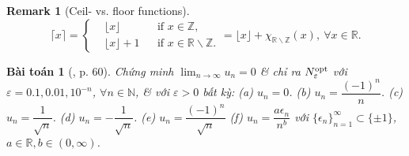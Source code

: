 \documentclass[oneside]{book}
\newtheorem{baitoan}{Bài toán}
\newtheorem{remark}{Remark}
\begin{document}
\begin{remark}[Ceil- vs. floor functions]
	\begin{equation*}
		\lceil x\rceil = \left\{\begin{split}
			&\lfloor x\rfloor&&\mbox{if } x\in\mathbb{Z},\\
			&\lfloor x\rfloor + 1&&\mbox{if } x\in\mathbb{R}\backslash\mathbb{Z}.
		\end{split}\right. = \lfloor x\rfloor + \chi_{\mathbb{R}\backslash\mathbb{Z}}(x),\ \forall x\in\mathbb{R}.
	\end{equation*}
\end{remark}

\begin{baitoan}[\cite{SGK_Toan_11_CD_tap_1}, p. 60]
	Chứng minh $\lim_{n\to\infty} u_n = 0$ \& chỉ ra $N_\varepsilon^{\rm opt}$ với $\varepsilon = 0.1,0.01,10^{-n}$, $\forall n\in\mathbb{N}$, \& với $\varepsilon > 0$ bất kỳ: (a) $u_n = 0$. (b) $u_n = \dfrac{(-1)^n}{n}$. (c) $u_n = \dfrac{1}{\sqrt{n}}$. (d) $u_n = -\dfrac{1}{\sqrt{n}}$. (e) $u_n = \dfrac{(-1)^n}{\sqrt{n}}$ (f) $u_n = \dfrac{a\epsilon_n}{n^b}$ với $\{\epsilon_n\}_{n=1}^\infty\subset\{\pm1\}$, $a\in\mathbb{R},b\in(0,\infty)$.
\end{baitoan}
\end{document}
